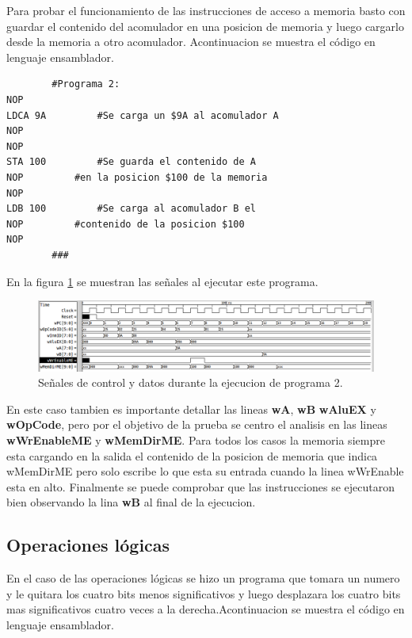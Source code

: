 \documentclass[paper=letter, fontsize=12pt]{article}
\begin{document}
Para probar el funcionamiento de las instrucciones de acceso a memoria basto con guardar el contenido del acomulador en una posicion de memoria y luego cargarlo desde la memoria a otro acomulador. Acontinuacion se muestra el código en lenguaje ensamblador.

\begin{lstlisting}
		#Programa 2:
NOP
LDCA 9A			#Se carga un $9A al acomulador A
NOP
NOP
STA 100			#Se guarda el contenido de A 
NOP			#en la posicion $100 de la memoria
NOP
LDB 100			#Se carga al acomulador B el 
NOP			#contenido de la posicion $100
NOP
		###
\end{lstlisting}

En la figura \ref{i:p2} se muestran las señales al ejecutar este programa.\\

\begin{figure}[hbtp]
\centering
\includegraphics[width=1\linewidth]{../media/Prog2.png}
\caption{Señales de control y datos durante la ejecucion de programa 2.}
\label{i:p2}
\end{figure}

En este caso tambien es importante detallar las lineas \textbf{wA}, \textbf{wB} \textbf{wAluEX} y \textbf{wOpCode}, pero por el objetivo de la prueba se centro el analisis en las lineas \textbf{wWrEnableME} y \textbf{wMemDirME}. Para todos los casos la memoria siempre esta cargando en la salida el contenido de la posicion de memoria que indica wMemDirME pero solo escribe lo que esta su entrada cuando la linea wWrEnable esta en alto. Finalmente se puede comprobar que las instrucciones se ejecutaron bien observando la lina \textbf{wB} al final de la ejecucion.

\clearpage
\subsection{Operaciones lógicas}

En el caso de las operaciones lógicas se hizo un programa que tomara un numero y le quitara los cuatro bits menos significativos y luego desplazara los cuatro bits mas significativos cuatro veces a la derecha.Acontinuacion se muestra el código en lenguaje ensamblador.
\end{document}
